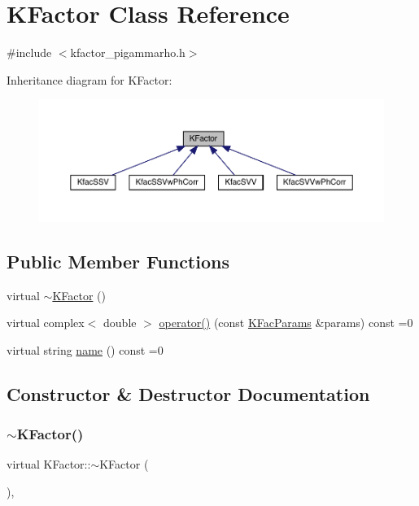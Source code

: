 \hypertarget{classKFactor}{}\section{K\+Factor Class Reference}
\label{classKFactor}


{\ttfamily \#include $<$kfactor\+\_\+pigammarho.\+h$>$}



Inheritance diagram for K\+Factor\+:
\nopagebreak
\begin{figure}[H]
\begin{center}
\leavevmode
\includegraphics[width=350pt]{d0/d85/classKFactor__inherit__graph}
\end{center}
\end{figure}
\subsection*{Public Member Functions}
\begin{DoxyCompactItemize}
\item 
virtual \mbox{\hyperlink{classKFactor_a8a39c5bbfa86a5603d95af238845cfd9}{$\sim$\+K\+Factor}} ()
\item 
virtual complex$<$ double $>$ \mbox{\hyperlink{classKFactor_a4273897de4ef590083c7ef208b8d0f18}{operator()}} (const \mbox{\hyperlink{classKFacParams}{K\+Fac\+Params}} \&params) const =0
\item 
virtual string \mbox{\hyperlink{classKFactor_ae578f8d6e4b525895427717da99cab6c}{name}} () const =0
\end{DoxyCompactItemize}


\subsection{Constructor \& Destructor Documentation}
\mbox{\label{classKFactor_a8a39c5bbfa86a5603d95af238845cfd9}} 
\subsubsection{\texorpdfstring{$\sim$KFactor()}{~KFactor()}}
{\footnotesize\ttfamily virtual K\+Factor\+::$\sim$\+K\+Factor (\begin{DoxyParamCaption}{ }\end{DoxyParamCaption})\hspace{0.3cm}{\ttfamily [inline]}, {\ttfamily [virtual]}}



